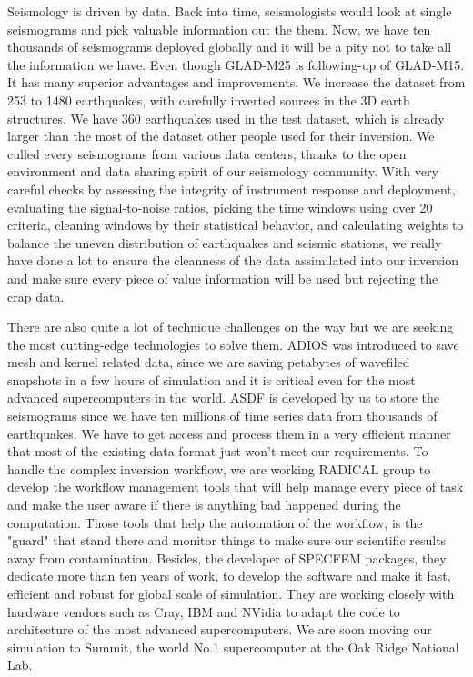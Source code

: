 \documentclass[extra,mreferee]{gji}
\begin{document}
Seismology is driven by data. Back into time, seismologists would look at
single seismograms and pick valuable information out the them. Now, we have
ten thousands of seismograms deployed globally and it will be a pity not
to take all the information we have. Even though GLAD-M25 is following-up
of GLAD-M15. It has many superior advantages and improvements. We increase
the dataset from 253 to 1480 earthquakes, with carefully inverted sources
in the 3D earth structures. We have 360 earthquakes used in the test
dataset, which is already larger than the most of the dataset other people used
for their inversion. We culled every seismograms from various data centers,
thanks to the open environment and data sharing spirit of our seismology community.
With very careful checks by assessing the integrity of instrument response
and deployment, evaluating the signal-to-noise ratios, picking the time windows
using over 20 criteria, cleaning windows by their statistical behavior, and
calculating weights to balance the uneven distribution of earthquakes and
seismic stations, we really have done a lot to ensure the cleanness of the
data assimilated into our inversion and make sure every piece of value information
will be used but rejecting the crap data.

There are also quite a lot of technique challenges on the way but we are seeking
the most cutting-edge technologies to solve them. ADIOS was introduced to save mesh
and kernel related data, since we are saving petabytes of wavefiled snapshots
in a few hours of simulation and it is critical even for the most advanced
supercomputers in the world. ASDF is developed by us to store the seismograms
since we have ten millions of time series data from thousands of earthquakes.
We have to get access and process them in a very efficient manner that most of
the existing data format just won't meet our requirements. To handle the complex
inversion workflow, we are working RADICAL group to develop the workflow management
tools that will help manage every piece of task and make the user aware if there
is anything bad happened during the computation. Those tools that help the
automation of the workflow, is the "guard" that stand there and monitor things
to make sure our scientific results away from contamination. Besides, the
developer of SPECFEM packages, they dedicate more than ten years of work,
to develop the software and make it fast, efficient and robust for global scale of simulation.
They are working closely with hardware vendors such as Cray, IBM and NVidia to adapt
the code to architecture of the most advanced supercomputers. We are soon
moving our simulation to Summit, the world No.1 supercomputer at the Oak Ridge
National Lab.
\end{document}
